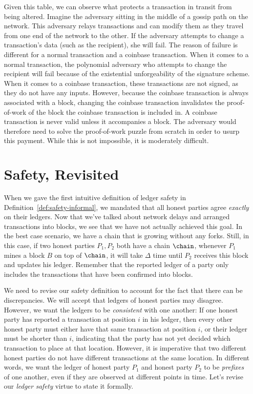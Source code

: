 Given this table, we can observe what protects a transaction in transit from being
altered. Imagine the adversary sitting in the middle of a gossip path on the network.
This adversary relays transactions and can modify them as they travel from one
end of the network to the other. If the adversary attempts to change a transaction's
data (such as the recipient), she will fail. The reason of failure is different for a
normal transaction and a coinbase transaction. When it comes to a normal transaction,
the polynomial adversary who attempts to change the recipient will fail because of the existential
unforgeability of the signature scheme. When it comes to a coinbase transaction,
these transactions are not signed, as they do not have any inputs. However, because
the coinbase transaction is always associated with a block, changing the coinbase
transaction invalidates the proof-of-work of the block the coinbase transaction is
included in. A coinbase transaction is never valid unless it accompanies a block.
The adversary would therefore need to solve the proof-of-work puzzle from scratch
in order to usurp this payment. While this is not impossible, it is moderately
difficult.

\section{Safety, Revisited}

When we gave the first intuitive definition of ledger safety in Definition~\ref{def:safety-informal}, we mandated that all honest parties
agree \emph{exactly} on their ledgers. Now that we've talked about network delays and arranged transactions into blocks, we see
that we have not actually achieved this goal. In the best case scenario, we have a chain that is growing without any forks. Still, in this
case, if two honest parties $P_1, P_2$ both have a chain $\chain$, whenever $P_1$ mines a block $B$ on top of $\chain$, it will take
$\Delta$ time until $P_2$ receives this block and updates his ledger. Remember that the reported ledger of a party only includes the
transactions that have been confirmed into blocks.

We need to revise our safety definition to account for the fact that there can be discrepancies. We will accept that ledgers of honest
parties may disagree. However, we want the ledgers to be \emph{consistent} with one another: If one honest party has reported a transaction
at position $i$ in his ledger, then every other honest party must either have that same transaction at position $i$, or their ledger
must be shorter than $i$, indicating that the party has not yet decided which transaction to place at that location. However, it is imperative
that two different honest parties do not have different transactions at the same location. In different words, we want the ledger of
honest party $P_1$ and honest party $P_2$ to be \emph{prefixes} of one another, even if they are observed at different points in time.
Let's revise our \emph{ledger safety} virtue to state it formally.

